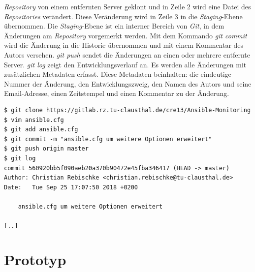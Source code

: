 \documentclass[titlepage]{report}
\begin{document}
\emph{Repository} von einem entfernten Server geklont und in Zeile 2
wird eine Datei des \emph{Repositories} verändert. Diese Veränderung
wird in Zeile 3 in die \emph{Staging}\hyp{}Ebene übernommen. Die
\emph{Staging}\hyp{}Ebene ist ein interner Bereich von \emph{Git}, in dem
Änderungen am \emph{Repository} vorgemerkt werden\cite{PROGIT}. Mit dem
Kommando \emph{git commit} wird die Änderung in die Historie übernommen
und mit einem Kommentar des Autors versehen. \emph{git push} sendet die
Änderungen an einen oder mehrere entfernte Server. \emph{git log} zeigt
den Entwicklungsverlauf an. Es werden alle Änderungen mit
zusätzlichen Metadaten erfasst. Diese Metadaten beinhalten: die eindeutige
Nummer der Änderung, den Entwicklungszweig, den Namen des Autors und
seine Email\hyp{}Adresse, einen Zeitstempel und einen Kommentar zu der
Änderung.
\begin{minipage}{\linewidth}
\begin{lstlisting}[caption={Beispiele für die Verwendung des
Git-Clients},label={lst:gitexample}]
$ git clone https://gitlab.rz.tu-clausthal.de/cre13/Ansible-Monitoring
$ vim ansible.cfg
$ git add ansible.cfg
$ git commit -m "ansible.cfg um weitere Optionen erweitert"
$ git push origin master
$ git log
commit 560920bb5f090aeb20a370b90472e45fba346417 (HEAD -> master)
Author: Christian Rebischke <christian.rebischke@tu-clausthal.de>
Date:   Tue Sep 25 17:07:50 2018 +0200

    ansible.cfg um weitere Optionen erweitert

[..]
\end{lstlisting}
\end{minipage}
\section{Prototyp}
\end{document}
